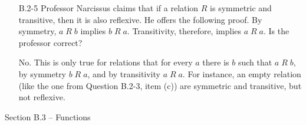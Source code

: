 \begin{enumerate}
\item[B.2{-}5]{Professor Narcissus claims that if a relation $R$ is symmetric
and transitive, then it is also reflexive. He offers the following proof. By
symmetry, $a\;R\;b$ implies $b\;R\;a$. Transitivity, therefore, implies
$a\;R\;a$. Is the professor correct?}

\begin{framed}
No. This is only true for relations that for every $a$ there is $b$ such that
$a\;R\;b$, by symmetry $b\;R\;a$, and by transitivity $a\;R\;a$. For
instance, an empty relation (like the one from Question B.2-3, item (c)) are
symmetric and transitive, but not reflexive.
\end{framed}

\end{enumerate}

\newpage

{\large Section B.3 {--} Functions}

